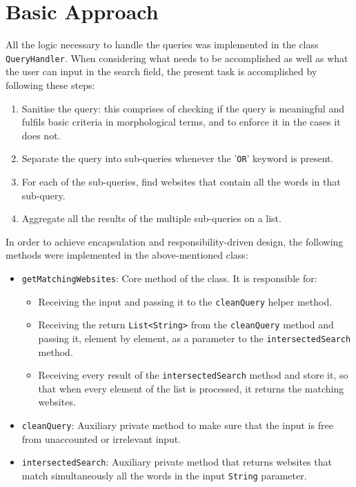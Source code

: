 \section{Basic Approach} %
All the logic necessary to handle the queries was implemented in the class {\tt QueryHandler}.
When considering what needs to be accomplished as well as what the user can input in the search field, the present task is accomplished by following these steps:
\begin{enumerate}
    \item Sanitise the query: this comprises of checking if the query is meaningful and fulfils basic criteria in morphological terms, and to enforce it in the cases it does not.
    \item Separate the query into sub-queries whenever the '{\tt OR}' keyword is present.
    \item For each of the sub-queries, find websites that contain all the words in that sub-query.
    \item Aggregate all the results of the multiple sub-queries on a list.
\end{enumerate}
In order to achieve encapsulation and responsibility-driven design, the following methods were implemented in the above-mentioned class:
\begin{itemize}
    \item {\tt getMatchingWebsites}: Core method of the class. It is responsible for:
    \begin{itemize}
        \item Receiving the input and passing it to the {\tt cleanQuery} helper method.
        \item Receiving the return {\tt List<String>} from the {\tt cleanQuery} method and passing it, element by element, as a parameter to the {\tt intersectedSearch} method.
        \item Receiving every result of the {\tt intersectedSearch} method and store it, so that when every element of the list is processed, it returns the matching websites.
    \end{itemize}
    \item {\tt cleanQuery}: Auxiliary private method to make sure that the input is free from unaccounted or irrelevant input.
    \item {\tt intersectedSearch}: Auxiliary private method that returns websites that match simultaneously all the words in the input {\tt String} parameter.
\end{itemize}

